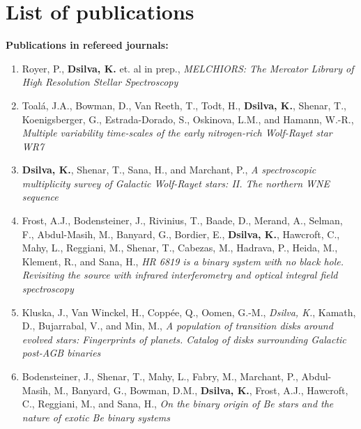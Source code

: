 \chapter{List of publications}\label{ch:publications}

\begin{large}
\textbf{Publications in refereed journals:}
\end{large}

\begin{enumerate}

\item Royer, P., \textbf{Dsilva, K.} et. al in prep., \textit{MELCHIORS: The Mercator Library of High Resolution Stellar Spectroscopy}

\item Toal\'a, J.A., Bowman, D., Van Reeth, T., Todt, H., \textbf{Dsilva, K.}, Shenar, T., Koenigsberger, G., Estrada-Dorado, S., Oskinova, L.M., and Hamann, W.-R., \textit{Multiple variability time-scales of the early nitrogen-rich Wolf-Rayet star WR7}

\item \textbf{Dsilva, K.}, Shenar, T., Sana, H., and Marchant, P., \textit{A spectroscopic multiplicity survey of Galactic Wolf-Rayet stars: II. The northern WNE sequence}

\item Frost, A.J., Bodensteiner, J., Rivinius, T., Baade, D., Merand, A., Selman, F., Abdul-Masih, M., Banyard, G., Bordier, E., \textbf{Dsilva, K.}, Hawcroft, C., Mahy, L., Reggiani, M., Shenar, T., Cabezas, M., Hadrava, P., Heida, M., Klement, R., and Sana, H., \textit{HR 6819 is a binary system with no black hole. Revisiting the source with infrared interferometry and optical integral field spectroscopy}

\item Kluska, J., Van Winckel, H., Coppée, Q., Oomen, G.-M., \textit{Dsilva, K.}, Kamath, D., Bujarrabal, V., and Min, M., \textit{A population of transition disks around evolved stars: Fingerprints of planets. Catalog of disks surrounding Galactic post-AGB binaries}

\item Bodensteiner, J., Shenar, T., Mahy, L., Fabry, M., Marchant, P., Abdul-Masih, M., Banyard, G., Bowman, D.M., \textbf{Dsilva, K.}, Frost, A.J., Hawcroft, C., Reggiani, M., and Sana, H., \textit{On the binary origin of Be stars and the nature of exotic Be binary systems}


\end{enumerate}
